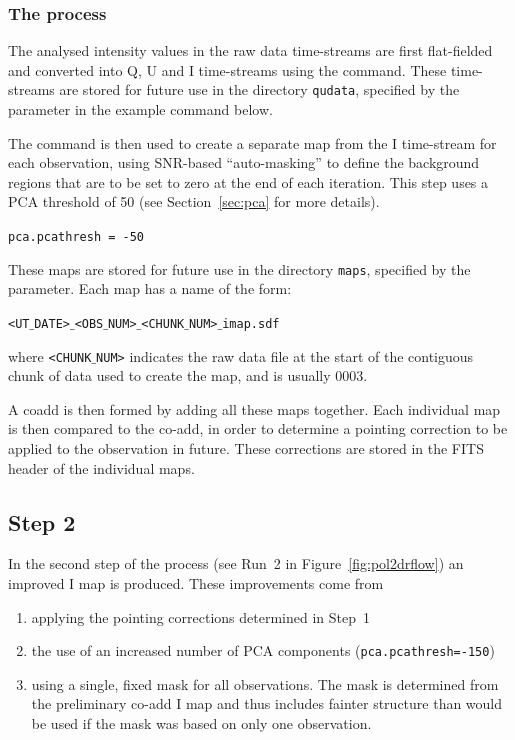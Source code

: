 \subsubsection*{The process}
The analysed intensity values in the raw data time-streams are first
flat-fielded and converted into Q, U and I time-streams using the
 command. These time-streams
are stored for future use in the directory \texttt{qudata}, specified by the
 parameter in the example command below.

The  command is then used to
create a separate map from the I time-stream for each observation,
using SNR-based ``auto-masking'' to define the background regions that
are to be set to zero at the end of each iteration. This step uses a
PCA threshold of 50 (see Section~\ref{sec:pca} for more details).

\texttt{pca.pcathresh = -50}

These maps are stored for future use in the directory \texttt{maps},
specified by the  parameter. Each map has a name of the form:

\texttt{<UT$\_$DATE>$\_$<OBS$\_$NUM>$\_$<CHUNK$\_$NUM>$\_$imap.sdf}

where \texttt{<CHUNK$\_$NUM>} indicates the raw data file at the start
of the contiguous chunk of data used to create the map, and is usually
0003.

A coadd is then formed by adding all these maps together. Each individual map
is then compared to the co-add, in order to determine a pointing correction
to be applied to the observation in future. These corrections are stored
in the FITS header of the individual maps.


\subsection*{Step 2}

In the second step of the process (see Run~2 in
Figure~\ref{fig:pol2drflow}) an improved I map is produced. These
improvements come from
\begin{enumerate}
\item applying the pointing corrections determined in Step~1
\item the use of an increased number of PCA components
  (\texttt{pca.pcathresh=-150})
\item using a single, fixed mask for all observations. The mask is
  determined from the preliminary co-add I map and thus includes
  fainter structure than would be used if the mask was based on only
  one observation.
\end{enumerate}

